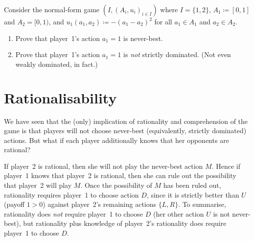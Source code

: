 \begin{exercise}
	\label{exercise:pearce_counterex}
	Consider the normal-form game $\left(I,(A_i,u_i)_{i \in I}\right)$ where $I = \{1,2\}$, $A_1 \coloneqq [0,1]$ and $A_2 = [0,1)$, and $u_1(a_1,a_2) \coloneqq - (a_1-a_2)^2$ for all $a_1 \in A_1$ and $a_2 \in A_2$.

	\begin{enumerate}[label=(\alph*)]
	
		\item Prove that player~1's action $a_1 = 1$ is never-best.

		\item Prove that player~1's action $a_1 = 1$ is \emph{not} strictly dominated. (Not even weakly dominated, in fact.)
	
	\end{enumerate}
\end{exercise}



\section{Rationalisability}
\label{dom:rbty}

We have seen that the (only) implication of rationality and comprehension of the game is that players will not choose never-best (equivalently, strictly dominated) actions. But what if each player additionally knows that her opponents are rational?

\addtocounter{example}{-2}
\begin{example}
	\label{example:rbty_neverbest_rbty}
	If player~2 is rational, then she will not play the never-best action $M$. Hence if player~1 knows that player~2 is rational, then she can rule out the possibility that player~2 will play $M$. Once the possibility of $M$ has been ruled out, rationality requires player~1 to choose action $D$, since it is strictly better than $U$ (payoff $1>0$) against player~2's remaining actions $\{L,R\}$. To summarise, rationality does \emph{not} require player~1 to choose $D$ (her other action $U$ is not never-best), but rationality plus knowledge of player~2's rationality does require player~1 to choose $D$.
\end{example}
\addtocounter{example}{1}

